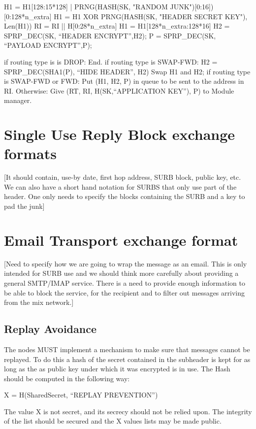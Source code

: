        H1 = H1[128:15*128] | PRNG(HASH(SK, "RANDOM 
                                               JUNK")[0:16])[0:128*n_extra]
	H1 = H1 XOR PRNG(HASH(SK, "HEADER SECRET KEY"), Len(H1))
        RI = RI || H[0:28*n_extra]
        H1 = H1[128*n_extra:128*16]
	H2 = SPRP_DEC(SK, ``HEADER ENCRYPT'',H2);
	P = SPRP_DEC(SK, ``PAYLOAD ENCRYPT'',P);

	if routing type is is DROP:
                End.
	if routing type is SWAP-FWD:
		H2 = SPRP_DEC(SHA1(P), ``HIDE HEADER'', H2)
		Swap H1 and H2;
        if routing type is SWAP-FWD or FWD:
	   	Put (H1, H2, P) in queue to be sent to the address in RI.
        Otherwise:
		Give (RT, RI, H(SK,``APPLICATION KEY''), P) to
		Module manager. 

\section{Single Use Reply Block exchange formats}

[It should contain, use-by date, first hop address, 
 SURB block, public key, etc.
 We can also have a short hand notation for SURBS that only
 use part of the header. One only needs to specify the 
 blocks containing the SURB and a key to pad the junk]

\section{Email Transport exchange format}

[Need to specify how we are going to wrap the message
 as an email. This is only intended for SURB use and
 we should think more carefully about providing a 
 general SMTP/IMAP service.
 There is a need to provide enough information to be 
 able to block the service, for the recipient and to
 filter out messages arriving from the mix network.]

\subsection{Replay Avoidance}

The nodes MUST implement a mechanism to make sure that messages cannot
be replayed. To do this a hash of the secret contained in the
subheader is kept for as long as the as public key under which it was
encrypted is in use. The Hash should be computed in the following way:

X = H(SharedSecret, ``REPLAY PREVENTION'')

The value X is not secret, and its secrecy should not be relied upon.
The integrity of the list should be secured and the X values lists may
be made public.

